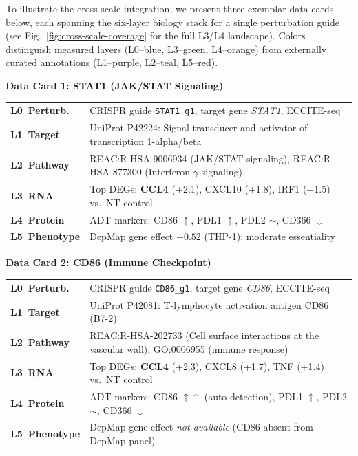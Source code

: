 \documentclass[sn-basic,Numbered,pdflatex]{sn-jnl}
\begin{document}
To illustrate the cross-scale integration, we present three exemplar data cards below, each spanning the six-layer biology stack for a single perturbation guide (see Fig.~\ref{fig:cross-scale-coverage} for the full L3/L4 landscape). Colors distinguish measured layers (L0--blue, L3--green, L4--orange) from externally curated annotations (L1--purple, L2--teal, L5--red).

\vspace{4pt}

\noindent\colorbox{gray!20}{\textbf{\small Data Card 1: STAT1 (JAK/STAT Signaling)}}
\vspace{3pt}

\noindent\begin{tabular}{@{}p{2.5cm} p{13.2cm}@{}}
\cellcolor{blue!15} \textbf{L0~Perturb.} & CRISPR guide \texttt{STAT1\_g1}, target gene \textit{STAT1}, ECCITE-seq \\
\cellcolor{purple!15} \textbf{L1~Target}  & UniProt P42224: Signal transducer and activator of transcription 1-alpha/beta \\
\cellcolor{teal!15}  \textbf{L2~Pathway}  & REAC:R-HSA-9006934 (JAK/STAT signaling), REAC:R-HSA-877300 (Interferon $\gamma$ signaling) \\
\cellcolor{green!15} \textbf{L3~RNA}      & Top DEGs: \textbf{CCL4} (+2.1), CXCL10 (+1.8), IRF1 (+1.5) vs.\ NT control \\
\cellcolor{orange!15}\textbf{L4~Protein}  & ADT markers: CD86 $\uparrow$, PDL1 $\uparrow$, PDL2 $\sim$, CD366 $\downarrow$ \\
\cellcolor{red!15}   \textbf{L5~Phenotype}& DepMap gene effect $-0.52$ (THP-1); moderate essentiality \\
\end{tabular}

\vspace{6pt}

\noindent\colorbox{gray!20}{\textbf{\small Data Card 2: CD86 (Immune Checkpoint)}}
\vspace{3pt}

\noindent\begin{tabular}{@{}p{2.5cm} p{13.2cm}@{}}
\cellcolor{blue!15} \textbf{L0~Perturb.} & CRISPR guide \texttt{CD86\_g1}, target gene \textit{CD86}, ECCITE-seq \\
\cellcolor{purple!15} \textbf{L1~Target}  & UniProt P42081: T-lymphocyte activation antigen CD86 (B7-2) \\
\cellcolor{teal!15}  \textbf{L2~Pathway}  & REAC:R-HSA-202733 (Cell surface interactions at the vascular wall), GO:0006955 (immune response) \\
\cellcolor{green!15} \textbf{L3~RNA}      & Top DEGs: \textbf{CCL4} (+2.3), CXCL8 (+1.7), TNF (+1.4) vs.\ NT control \\
\cellcolor{orange!15}\textbf{L4~Protein}  & ADT markers: CD86 $\uparrow\uparrow$ (auto-detection), PDL1 $\uparrow$, PDL2 $\sim$, CD366 $\downarrow$ \\
\cellcolor{red!15}   \textbf{L5~Phenotype}& DepMap gene effect \textit{not available} (CD86 absent from DepMap panel) \\
\end{tabular}
\end{document}
